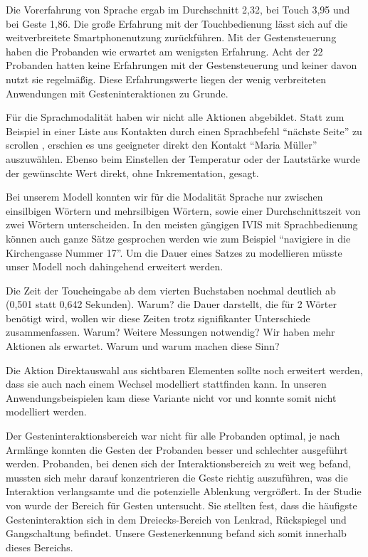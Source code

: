 Die Vorerfahrung von Sprache ergab im Durchschnitt 2,32, bei Touch 3,95 und bei Geste 1,86. Die große Erfahrung mit der Touchbedienung lässt sich auf die weitverbreitete Smartphonenutzung zurückführen. Mit der Gestensteuerung haben die Probanden wie erwartet am wenigsten Erfahrung. Acht der 22 Probanden hatten keine Erfahrungen mit der Gestensteuerung und keiner davon nutzt sie regelmäßig. Diese Erfahrungswerte liegen der wenig verbreiteten Anwendungen mit Gesteninteraktionen zu Grunde.

Für die Sprachmodalität haben wir nicht alle Aktionen abgebildet. 
Statt zum Beispiel in einer Liste aus Kontakten durch einen Sprachbefehl "`nächste Seite"' zu scrollen , erschien es uns geeigneter direkt den Kontakt "`Maria Müller"' auszuwählen. Ebenso beim Einstellen der Temperatur oder der Lautstärke wurde der gewünschte Wert direkt, ohne Inkrementation, gesagt.

Bei unserem Modell konnten wir für die Modalität Sprache nur zwischen einsilbigen Wörtern und mehrsilbigen Wörtern, sowie einer Durchschnittszeit von zwei Wörtern unterscheiden. In den meisten gängigen IVIS mit Sprachbedienung können auch ganze Sätze gesprochen werden wie zum Beispiel "`navigiere in die Kirchengasse Nummer 17"'. Um die Dauer eines Satzes zu modellieren müsste unser Modell noch dahingehend erweitert werden. 

Die Zeit der Toucheingabe ab dem vierten Buchstaben nochmal deutlich ab (0,501 statt 0,642 Sekunden). Warum?
die Dauer darstellt, die für 2 Wörter benötigt wird, wollen wir diese Zeiten trotz signifikanter Unterschiede zusammenfassen. Warum? Weitere Messungen notwendig?
Wir haben mehr Aktionen als erwartet. Warum und warum machen diese Sinn?

Die Aktion Direktauswahl aus sichtbaren Elementen sollte noch erweitert werden, dass sie auch nach einem Wechsel modelliert stattfinden kann. In unseren Anwendungsbeispielen kam diese Variante nicht vor und konnte somit nicht modelliert werden.

Der Gesteninteraktionsbereich war nicht für alle Probanden optimal, je nach Armlänge konnten die Gesten der Probanden besser und schlechter ausgeführt werden. Probanden, bei denen sich der Interaktionsbereich zu weit weg befand, mussten sich mehr darauf konzentrieren die Geste richtig auszuführen, was die Interaktion verlangsamte und die potenzielle Ablenkung vergrößert. In der Studie von \citet{Riener:2013:SIG} wurde der Bereich für Gesten untersucht. 
Sie stellten fest, dass die häufigste Gesteninteraktion sich in dem Dreiecks-Bereich von Lenkrad, Rückspiegel und Gangschaltung befindet. 
Unsere Gestenerkennung befand sich somit innerhalb dieses Bereichs.


